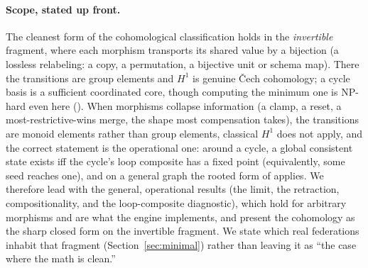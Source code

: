 \documentclass[11pt,a4paper]{article}
\theoremstyle{plain}
\theoremstyle{definition}
\theoremstyle{remark}
\newcommand{\Ho}{H^1}
\renewcommand{\_}{\origunderscore\allowbreak}
\begin{document}
\paragraph{Scope, stated up front.}
The cleanest form of the cohomological classification holds in the \emph{invertible} fragment, where
each morphism transports its shared value by a bijection (a lossless relabeling: a copy, a
permutation, a bijective unit or schema map). There the transitions are group elements and $\Ho$ is
genuine \v{C}ech cohomology; a cycle basis is a sufficient coordinated core, though computing the
minimum one is NP-hard even here (). When morphisms collapse information (a clamp, a reset, a most-restrictive-wins merge,
the shape most compensation takes), the transitions are monoid elements rather than group elements,
classical $\Ho$ does not apply, and the correct statement is the operational one: around a cycle, a
global consistent state exists iff the cycle's loop composite has a fixed point (equivalently, some
seed reaches one), and on a general graph the rooted form of  applies. We therefore lead with
the general, operational results (the limit, the retraction, compositionality, and the loop-composite
diagnostic), which hold for arbitrary morphisms and are what the engine implements, and present the
cohomology as the sharp closed form on the invertible fragment. We state which real federations
inhabit that fragment (Section~\ref{sec:minimal}) rather than leaving it as ``the case where the math
is clean.''
\end{document}
